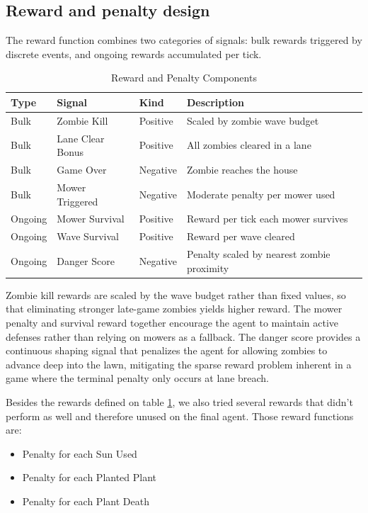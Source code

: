 \documentclass[conference,onecolumn]{IEEEtran}
\begin{document}
\subsection{Reward and penalty design}
The reward function combines two categories of signals: bulk rewards triggered by discrete events, and ongoing rewards accumulated per tick.

\begin{table}[h]
\centering
\caption{Reward and Penalty Components}
\label{tab:reward}
\begin{tabular}{llll}
\hline
\textbf{Type} & \textbf{Signal} & \textbf{Kind} & \textbf{Description} \\
\hline
Bulk & Zombie Kill & Positive & Scaled by zombie wave budget \\
Bulk & Lane Clear Bonus & Positive & All zombies cleared in a lane \\
Bulk & Game Over & Negative & Zombie reaches the house \\
Bulk & Mower Triggered & Negative & Moderate penalty per mower used \\
\hline
Ongoing & Mower Survival & Positive & Reward per tick each mower survives \\
Ongoing & Wave Survival & Positive & Reward per wave cleared \\
Ongoing & Danger Score & Negative & Penalty scaled by nearest zombie proximity \\
\hline
\end{tabular}
\end{table}

Zombie kill rewards are scaled by the wave budget rather than fixed values, so that eliminating stronger late-game zombies yields higher reward. The mower penalty and survival reward together encourage the agent to maintain active defenses rather than relying on mowers as a fallback. The danger score provides a continuous shaping signal that penalizes the agent for allowing zombies to advance deep into the lawn, mitigating the sparse reward problem inherent in a game where the terminal penalty only occurs at lane breach.

Besides the rewards defined on table \ref{tab:reward}, we also tried several rewards that didn't perform as well and therefore unused on the final agent. Those reward functions are:
\begin{itemize}
    \item Penalty for each Sun Used
    \item Penalty for each Planted Plant
    \item Penalty for each Plant Death
\end{itemize}
\end{document}
